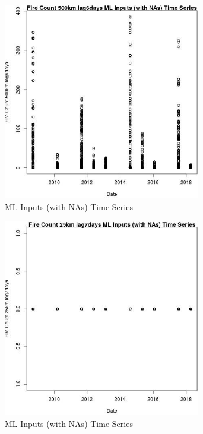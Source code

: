 \begin{figure} 
\centering  
\includegraphics[width=0.77\textwidth]{Code_Outputs/Report_ML_input_PM25_Step4_part_e_de_duplicated_aves_compiled_2019-05-18wNAs_Fire_Count_500km_lag6daysvDate.jpg} 
\caption{\label{fig:Report_ML_input_PM25_Step4_part_e_de_duplicated_aves_compiled_2019-05-18wNAsFire_Count_500km_lag6daysvDate}ML Inputs (with NAs) Time Series} 
\end{figure} 
 

\begin{figure} 
\centering  
\includegraphics[width=0.77\textwidth]{Code_Outputs/Report_ML_input_PM25_Step4_part_e_de_duplicated_aves_compiled_2019-05-18wNAs_Fire_Count_25km_lag7daysvDate.jpg} 
\caption{\label{fig:Report_ML_input_PM25_Step4_part_e_de_duplicated_aves_compiled_2019-05-18wNAsFire_Count_25km_lag7daysvDate}ML Inputs (with NAs) Time Series} 
\end{figure} 
 

